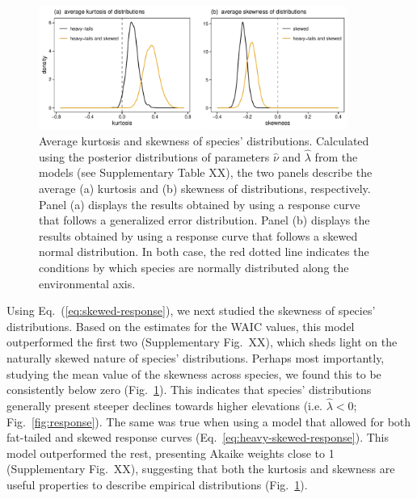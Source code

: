 \documentclass[11pt, a4paper]{article}
\begin{document}
\begin{figure}[ht]
  \centering
    \includegraphics[width=0.9\textwidth]{figures/kurto-skew}
    	  \vspace{0.1cm}
	   \caption{Average kurtosis and skewness of species' distributions. Calculated using the posterior distributions of parameters $\hat{\nu}$ and $\hat{\lambda}$ from the models (see Supplementary Table XX), the two panels describe the average (a) kurtosis and (b) skewness of distributions, respectively. Panel (a) displays the results obtained by using a response curve that follows a generalized error distribution. Panel (b) displays the results obtained by using a response curve that follows a skewed normal distribution. In both case, the red dotted line indicates the conditions by which species are normally distributed along the environmental axis.}
      \label{fig:kurtosis-skewness}
\end{figure}

Using Eq.~(\ref{eq:skewed-response}), we next studied the skewness of species' distributions. Based on the estimates for the WAIC values, this model outperformed the first two (Supplementary Fig.~XX), which sheds light on the naturally skewed nature of species' distributions. Perhaps most importantly, studying the mean value of the skewness across species, we found this to be consistently below zero (Fig.~\ref{fig:kurtosis-skewness}). This indicates that species' distributions generally present steeper declines towards higher elevations (i.e. $\hat{\lambda}<0$; Fig.~\ref{fig:response}). The same was true when using a model that allowed for both fat-tailed and skewed response curves (Eq.~\ref{eq:heavy-skewed-response}). This model outperformed the rest, presenting Akaike weights close to 1 (Supplementary Fig.~XX), suggesting that both the kurtosis and skewness are useful properties to describe empirical distributions (Fig.~\ref{fig:kurtosis-skewness}). 
\end{document}
